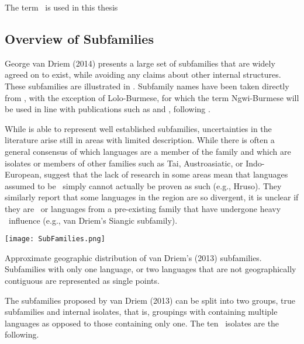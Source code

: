 The term \lfam\ is used in this thesis \lfamreason\

\subsection{Overview of Subfamilies}\label{ss:THOverview:Subfamilies}

George van Driem (2014) \nocite{VanDriem2014} presents a large set of subfamilies that are widely agreed on to exist, while avoiding any claims about other internal structures. These subfamilies are illustrated in . Subfamily names have been taken directly from , with the exception of Lolo-Burmese, for which the term Ngwi-Burmese will be used in line with publications such as  and , following .

While  is able to represent well established subfamilies, uncertainties in the literature arise still in areas with limited description. While there is often a general consensus of which languages are a member of the family and which are isolates or members of other families such as Tai, Austroasiatic, or Indo-European,  suggest that the lack of research in some areas mean that languages assumed to be \lfam\ simply cannot actually be proven as such (e.g., Hruso). They similarly report that some languages in the region are so divergent, it is unclear if they are \lfam\ or languages from a pre-existing family that have undergone heavy \lfam\ influence (e.g., van Driem's Siangic subfamily).

\begin{map}

\centering
\texttt{[image: SubFamilies.png]}
\caption{Approximate geographic distribution of van Driem's (2013) subfamilies. Subfamilies with only one language, or two languages that are not geographically contiguous are represented as single points.}
\label{fig:SubFamMap}
\end{map}

The subfamilies proposed by van Driem (2013) can be split into two groups, true subfamilies and internal isolates, that is, groupings with containing multiple languages as opposed to those containing only one. The ten \lfam\ isolates are the following.


